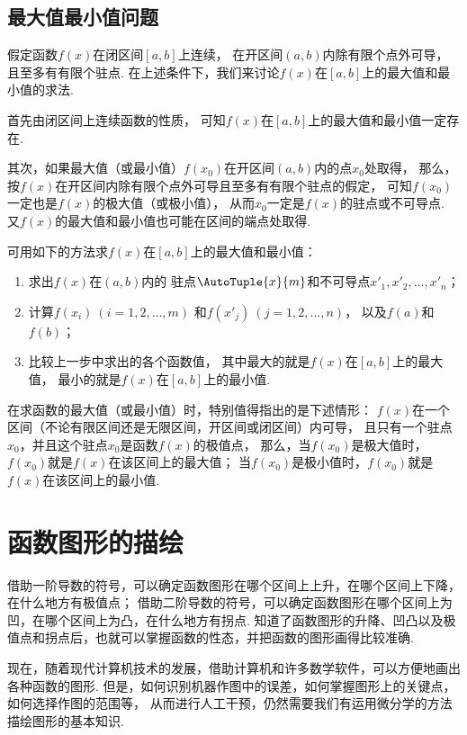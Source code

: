 \subsection{最大值最小值问题}
假定函数\(f(x)\)在闭区间\([a,b]\)上连续，
在开区间\((a,b)\)内除有限个点外可导，
且至多有有限个驻点.
在上述条件下，我们来讨论\(f(x)\)在\([a,b]\)上的最大值和最小值的求法.

首先由闭区间上连续函数的性质，
可知\(f(x)\)在\([a,b]\)上的最大值和最小值一定存在.

其次，如果最大值（或最小值）\(f(x_0)\)在开区间\((a,b)\)内的点\(x_0\)处取得，
那么，按\(f(x)\)在开区间内除有限个点外可导且至多有有限个驻点的假定，
可知\(f(x_0)\)一定也是\(f(x)\)的极大值（或极小值），
从而\(x_0\)一定是\(f(x)\)的驻点或不可导点.
又\(f(x)\)的最大值和最小值也可能在区间的端点处取得.

可用如下的方法求\(f(x)\)在\([a,b]\)上的最大值和最小值：
\begin{enumerate}
	\item 求出\(f(x)\)在\((a,b)\)内的
	驻点\(\AutoTuple{x}{m}\)和不可导点\(x'_1,x'_2,\dotsc,x'_n\)；
	\item 计算\(f(x_i)\ (i=1,2,\dotsc,m)\)
	和\(f(x'_j)\ (j=1,2,\dotsc,n)\)，
	以及\(f(a)\)和\(f(b)\)；
	\item 比较上一步中求出的各个函数值，
	其中最大的就是\(f(x)\)在\([a,b]\)上的最大值，
	最小的就是\(f(x)\)在\([a,b]\)上的最小值.
\end{enumerate}

在求函数的最大值（或最小值）时，特别值得指出的是下述情形：
\(f(x)\)在一个区间（不论有限区间还是无限区间，开区间或闭区间）内可导，
且只有一个驻点\(x_0\)，并且这个驻点\(x_0\)是函数\(f(x)\)的极值点，
那么，当\(f(x_0)\)是极大值时，\(f(x_0)\)就是\(f(x)\)在该区间上的最大值；
当\(f(x_0)\)是极小值时，\(f(x_0)\)就是\(f(x)\)在该区间上的最小值.

\section{函数图形的描绘}
借助一阶导数的符号，可以确定函数图形在哪个区间上上升，在哪个区间上下降，在什么地方有极值点；
借助二阶导数的符号，可以确定函数图形在哪个区间上为凹，在哪个区间上为凸，在什么地方有拐点.
知道了函数图形的升降、凹凸以及极值点和拐点后，也就可以掌握函数的性态，并把函数的图形画得比较准确.

现在，随着现代计算机技术的发展，借助计算机和许多数学软件，可以方便地画出各种函数的图形.
但是，如何识别机器作图中的误差，如何掌握图形上的关键点，如何选择作图的范围等，
从而进行人工干预，仍然需要我们有运用微分学的方法描绘图形的基本知识.

